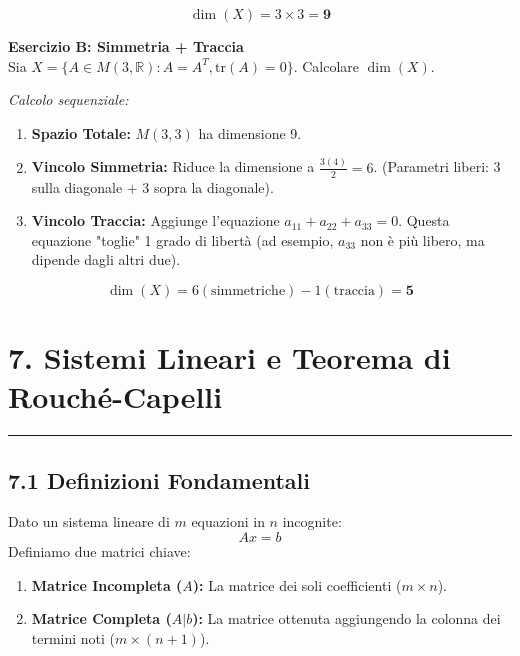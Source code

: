 \documentclass[10pt,a4paper]{article}
\begin{document}
\[ \dim(X) = 3 \times 3 = \mathbf{9} \]

\textbf{Esercizio B: Simmetria + Traccia}
\\ Sia $X = \{ A \in M(3, \mathbb{R}) : A = A^T, \text{tr}(A) = 0 \}$. Calcolare $\dim(X)$.

\textit{Calcolo sequenziale:}
\begin{enumerate}
    \item \textbf{Spazio Totale:} $M(3,3)$ ha dimensione 9.
    \item \textbf{Vincolo Simmetria:} Riduce la dimensione a $\frac{3(4)}{2} = 6$.
    (Parametri liberi: 3 sulla diagonale + 3 sopra la diagonale).
    \item \textbf{Vincolo Traccia:} Aggiunge l'equazione $a_{11} + a_{22} + a_{33} = 0$.
    Questa equazione "toglie" 1 grado di libertà (ad esempio, $a_{33}$ non è più libero, ma dipende dagli altri due).
\end{enumerate}

\[ \dim(X) = 6 (\text{simmetriche}) - 1 (\text{traccia}) = \mathbf{5} \]
\vspace{0.4cm}
\section*{7. Sistemi Lineari e Teorema di Rouché-Capelli}


\hrule
\vspace{0.4cm}

\subsection*{7.1 Definizioni Fondamentali}
Dato un sistema lineare di $m$ equazioni in $n$ incognite:
\[ Ax = b \]
Definiamo due matrici chiave:
\begin{enumerate}
    \item \textbf{Matrice Incompleta ($A$):} La matrice dei soli coefficienti ($m \times n$).
    \item \textbf{Matrice Completa ($A|b$):} La matrice ottenuta aggiungendo la colonna dei termini noti ($m \times (n+1)$).
\end{enumerate}

\vspace{0.3cm}
\end{document}
